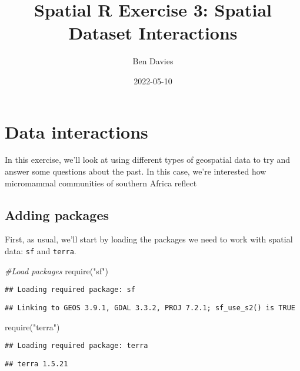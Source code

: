 \documentclass[
]{book}
\title{Spatial R Exercise 3: Spatial Dataset Interactions}
\author{Ben Davies}
\date{2022-05-10}
\newenvironment{Shaded}{\begin{snugshade}}{\end{snugshade}}
\newcommand{\CommentTok}[1]{\textcolor[rgb]{0.56,0.35,0.01}{\textit{#1}}}
\newcommand{\FunctionTok}[1]{\textcolor[rgb]{0.00,0.00,0.00}{#1}}
\newcommand{\NormalTok}[1]{#1}
\newcommand{\StringTok}[1]{\textcolor[rgb]{0.31,0.60,0.02}{#1}}
\begin{document}
\maketitle

{
\setcounter{tocdepth}{1}
\tableofcontents
}
\hypertarget{data-interactions}{%
\chapter{Data interactions}\label{data-interactions}}

In this exercise, we'll look at using different types of geospatial data to try and answer some questions about the past. In this case, we're interested how micromammal communities of southern Africa reflect

\hypertarget{adding-packages}{%
\section{Adding packages}\label{adding-packages}}

First, as usual, we'll start by loading the packages we need to work with spatial data: \texttt{sf} and \texttt{terra}.

\begin{Shaded}
\begin{Highlighting}[]
\CommentTok{\#Load packages}
\FunctionTok{require}\NormalTok{(}\StringTok{"sf"}\NormalTok{)}
\end{Highlighting}
\end{Shaded}

\begin{verbatim}
## Loading required package: sf
\end{verbatim}

\begin{verbatim}
## Linking to GEOS 3.9.1, GDAL 3.3.2, PROJ 7.2.1; sf_use_s2() is TRUE
\end{verbatim}

\begin{Shaded}
\begin{Highlighting}[]
\FunctionTok{require}\NormalTok{(}\StringTok{"terra"}\NormalTok{)}
\end{Highlighting}
\end{Shaded}

\begin{verbatim}
## Loading required package: terra
\end{verbatim}

\begin{verbatim}
## terra 1.5.21
\end{verbatim}
\end{document}
